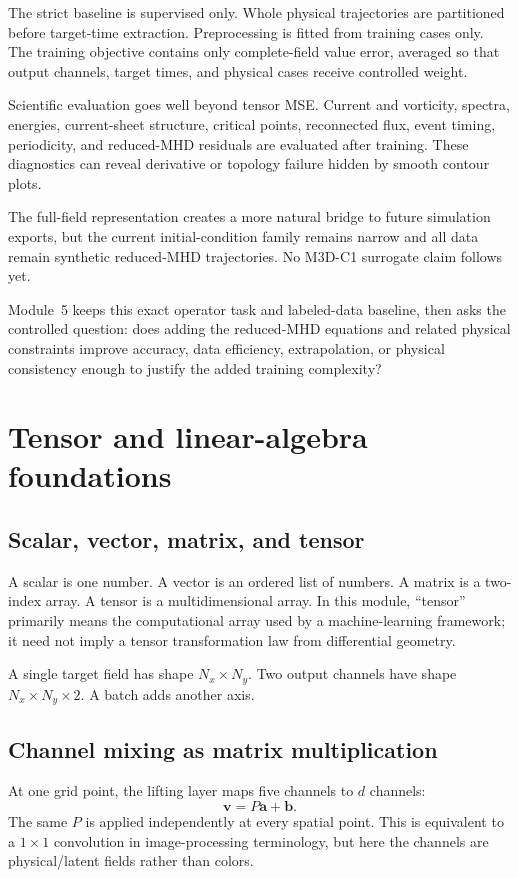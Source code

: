 \documentclass[11pt]{article}
\newcommand{\vect}[1]{\bm{#1}}
\begin{document}
The strict baseline is supervised only. Whole physical trajectories are partitioned before target-time extraction. Preprocessing is fitted from training cases only. The training objective contains only complete-field value error, averaged so that output channels, target times, and physical cases receive controlled weight.

Scientific evaluation goes well beyond tensor MSE. Current and vorticity, spectra, energies, current-sheet structure, critical points, reconnected flux, event timing, periodicity, and reduced-MHD residuals are evaluated after training. These diagnostics can reveal derivative or topology failure hidden by smooth contour plots.

The full-field representation creates a more natural bridge to future simulation exports, but the current initial-condition family remains narrow and all data remain synthetic reduced-MHD trajectories. No M3D-C1 surrogate claim follows yet.

Module~5 keeps this exact operator task and labeled-data baseline, then asks the controlled question: does adding the reduced-MHD equations and related physical constraints improve accuracy, data efficiency, extrapolation, or physical consistency enough to justify the added training complexity?

\appendix

\section{Tensor and linear-algebra foundations}
\label{app:tensors}

\subsection{Scalar, vector, matrix, and tensor}
A scalar is one number. A vector is an ordered list of numbers. A matrix is a two-index array. A tensor is a multidimensional array. In this module, ``tensor'' primarily means the computational array used by a machine-learning framework; it need not imply a tensor transformation law from differential geometry.

A single target field has shape $N_x\times N_y$. Two output channels have shape $N_x\times N_y\times2$. A batch adds another axis.

\subsection{Channel mixing as matrix multiplication}
At one grid point, the lifting layer maps five channels to $d$ channels:
\[
\vect v=P\vect a+\vect b.
\]
The same $P$ is applied independently at every spatial point. This is equivalent to a $1\times1$ convolution in image-processing terminology, but here the channels are physical/latent fields rather than colors.
\end{document}
